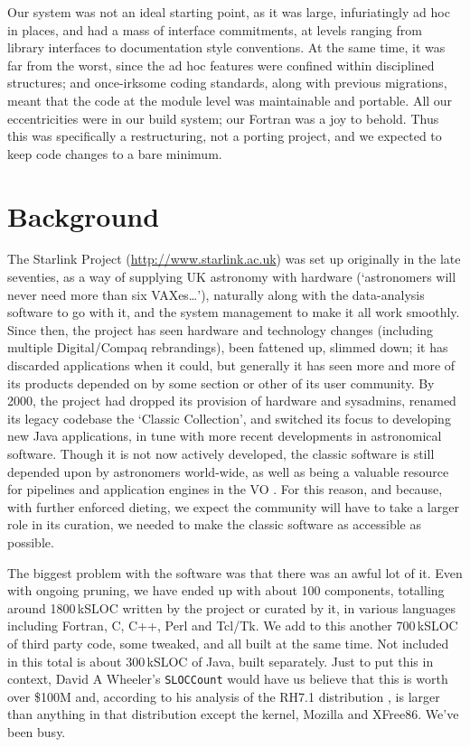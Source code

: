 \documentclass{speauth}
\begin{document}
Our system was not an ideal starting point, as it was large,
infuriatingly ad hoc in places, and had a mass of interface
commitments, at levels ranging from library interfaces to
documentation style conventions.  At the same time, it was far from
the worst, since the ad hoc features were confined within disciplined
structures; and once-irksome coding standards, along with previous
migrations, meant that the code at the module level was maintainable
and portable.  All our eccentricities were in our build system; our
Fortran was a joy to behold.  Thus this was specifically a
restructuring, not a porting project, and we expected to keep code
changes to a bare minimum.


\section{Background}
\label{s:background}


The Starlink Project (\url{http://www.starlink.ac.uk}) was set up
originally in the late seventies, as a way of supplying UK astronomy
with hardware (`astronomers will never need more than six
VAXes\dots'), naturally along with the data-analysis software to go
with it, and the system management to make it all work smoothly.
Since then, the project has seen hardware and technology changes
(including multiple Digital/Compaq rebrandings), been fattened up,
slimmed down; it has discarded applications when it could, but
generally it has seen more and more of its products depended on by
some section or other of its user community.  By 2000, the project had
dropped its provision of hardware and sysadmins, renamed its legacy
codebase the `Classic Collection', and switched its focus to
developing new Java applications, in tune with more recent
developments in astronomical software.  Though it is not now actively
developed, the classic software is still depended upon by astronomers
world-wide, as well as being a valuable resource for pipelines
\cite{cavanagh03,currie04} and application engines in the VO
\cite{giaretta05}.  For this reason, and because, with further
enforced dieting, we expect the community will have to take a larger
role in its curation, we needed to make the classic software as
accessible as possible.

The biggest problem with the software was that there was an awful lot
of it.  Even with ongoing pruning, we have ended up with about 100
components, totalling around 1800\,kSLOC written by the project or
curated by it, in various languages
including Fortran, C, C++, Perl and Tcl/Tk.  We add to this another
700\,kSLOC of third party code, some tweaked, and all built at the same
time.  Not included in this total is about 300\,kSLOC of Java,
built separately.  Just to put this in context, David A
Wheeler's \texttt{SLOCCount} would have us believe that this is worth
over \$100M and, according to his analysis of the RH7.1 distribution
\cite{wheeler02}, is larger than anything in
that distribution except the kernel, Mozilla and XFree86.  We've been busy.
\end{document}

